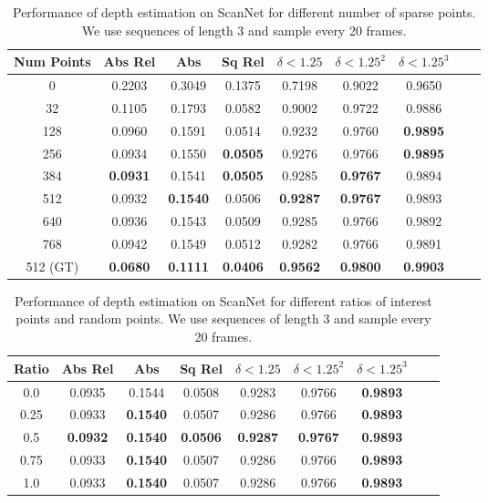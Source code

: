 \documentclass[runningheads]{llncs}
\begin{document}
\begin{table}[ht]
  \caption{Performance of depth estimation on ScanNet for different number of sparse points. We use sequences of length 3 and sample every 20 frames. }
  \centering
\begin{tabular}{ccccccccc}
 \hline 
   Num Points  &Abs Rel  &Abs & Sq Rel & \textbf{$\delta< 1.25$}& \textbf{$\delta < 1.25^2$}& \textbf{$\delta< 1.25^3$}\\

    \hline
0 &	0.2203 &	0.3049 &	0.1375 &	0.7198 &	0.9022 &	0.9650\\
32 &	0.1105 &	0.1793 &	0.0582 &	0.9002 &	0.9722 &	0.9886\\
128 &	0.0960 &	0.1591 &	0.0514 &	0.9232&	0.9760&	\textbf{0.9895}\\
256 &	0.0934&	0.1550&	\textbf{0.0505}&	0.9276&	0.9766&	\textbf{0.9895}\\
384 &	\textbf{0.0931}&	0.1541&	\textbf{0.0505}&	0.9285&	\textbf{0.9767}&	0.9894\\
512 &	0.0932 & \textbf{0.1540} & 0.0506 &  \textbf{0.9287} & \textbf{0.9767} & 0.9893 \\
640 &	0.0936&	0.1543&	0.0509&	0.9285&	0.9766&	0.9892\\
768 &	0.0942&	0.1549&	0.0512&	0.9282&	0.9766&	0.9891\\
\hline
512 (GT) &	\textbf{0.0680} & \textbf{0.1111} & \textbf{0.0406} &  \textbf{0.9562} & \textbf{0.9800} & \textbf{0.9903} \\
\hline
  \end{tabular}
\label{tablepoints}
\end{table}





\begin{table}[h]
  \caption{Performance of depth estimation on ScanNet for different ratios of interest points and random points. We use sequences of length 3 and sample every 20 frames. }
  \centering
\begin{tabular}{ccccccccc}
 \hline 
   Ratio  &Abs Rel  &Abs & Sq Rel & \textbf{$\delta< 1.25$}& \textbf{$\delta < 1.25^2$}& \textbf{$\delta< 1.25^3$}\\
    \hline
0.0 &	0.0935&	0.1544&	0.0508&	0.9283&	0.9766&	\textbf{0.9893}\\
0.25 &0.0933&	\textbf{0.1540}&	0.0507&	0.9286&	0.9766&	\textbf{0.9893}\\
0.5 &	\textbf{0.0932} & \textbf{0.1540} & \textbf{0.0506} &  \textbf{0.9287} & \textbf{0.9767} & \textbf{0.9893} \\
0.75 &	0.0933& \textbf{0.1540}& 0.0507& 0.9286& 0.9766& \textbf{0.9893}\\
1.0 &	0.0933&	\textbf{0.1540}&	0.0507&	0.9286&	0.9766&	\textbf{0.9893}\\
\hline
  \end{tabular}
\label{tableratio}
\end{table}
\end{document}

